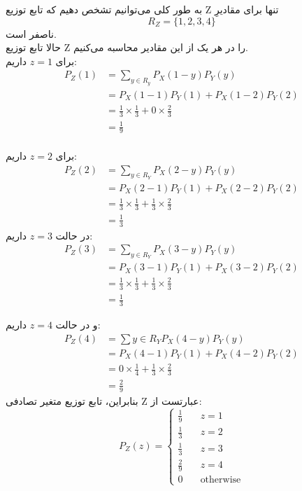 به طور کلی می‌توانیم تشخص دهیم که تابع توزیع Z تنها برای مقادیرِ
$$
R_Z = \{1, 2, 3, 4\}
$$
ناصفر است. \\
حالا تابع توزیع Z را در هر یک از این مقادیر محاسبه می‌کنیم.\\
برای 
$
z = 1
$
داریم:
\begin{align*}
P_Z(1) &= \sum\limits_{y \in R_y}^{} P_X(1 - y)P_Y(y) \\
&= P_X(1 - 1)P_Y(1) + P_X(1 - 2)P_Y(2) \\
&= \frac{1}{3} \times \frac{1}{3} + 0 \times \frac{2}{3}\\
&= \frac{1}{9}
\end{align*}
\\
برای 
$ z = 2 $
داریم:
\begin{align*}
P_Z(2) &= \sum\limits_{y \in R_Y}^{} P_X(2 - y)P_Y(y) \\
&= P_X(2 - 1)P_Y(1) + P_X(2 - 2)P_Y(2) \\
&= \frac{1}{3} \times \frac{1}{3} + \frac{1}{3}\times\frac{2}{3}\\
&= \frac{1}{3} 
\end{align*}
در حالت 
$
z = 3
$
داریم:
\begin{align*}
P_Z(3) &= \sum\limits_{y \in R_Y} P_X(3 - y)P_Y(y) \\
&= P_X(3 - 1)P_Y(1) + P_X(3 - 2)P_Y(2) \\
&= \frac{1}{3}\times\frac{1}{3} + \frac{1}{3}\times\frac{2}{3}\\
&= \frac{1}{3} 
\end{align*}

و در حالت 
$ z = 4 $
داریم:
\begin{align*}
P_Z(4) &= \sum\limits{y \in R_Y} P_X(4 - y)P_Y(y) \\
&= P_X(4 - 1)P_Y(1) + P_X(4 - 2)P_Y(2)\\
&= 0\times\frac{1}{4} + \frac{1}{3}\times\frac{2}{3}\\
&= \frac{2}{9}
\end{align*}
بنابراین، تابع توزیع متغیر تصادفی Z عبارتست از:
$$
P_Z(z) =
\begin{cases}
\frac{1}{9} &\quad z = 1\\
\frac{1}{3} &\quad z = 2\\
\frac{1}{3} &\quad z = 3\\
\frac{2}{9} &\quad z = 4\\
0 &\quad \text{otherwise}
\end{cases}
$$
